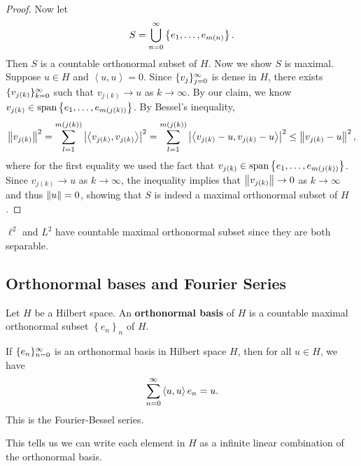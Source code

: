 \documentclass[a4paper]{article}
\renewcommand{\braket}[2]{\left\langle #1, #1 \right\rangle}
\begin{document}
\begin{proof}
Now let 
\[
S = \bigcup_{n=0}^\infty \left\{ e_1, \dots, e_{m(n)} \right\}.
\]
Then $S$ is a countable orthonormal subset of $H$.
Now we show $S$ is maximal. Suppose $u \in H$ and 
$\braket{u}{e_l} = 0$. Since $\{ v_j \}_{j=0}^\infty$ is dense in 
$H$, there exists $\{ v_{j(k)} \}_{k=0}^\infty$ such that 
$v_{j(k)} \to u$ as $k \to \infty$. 
By our claim, we know 
$v_{j(k)} \in \operatorname{span} \left\{ e_1, \dots, e_{m(j(k))} \right\}$.
By Bessel's inequality, 
\[
\begin{aligned}
\norm{v_{j(k)}}^2 
= \sum_{l=1}^{m(j(k))} \abs{\braket{v_{j(k)}}{e_l}}^2 
= \sum_{l=1}^{m(j(k))} \abs{\braket{v_{j(k)} - u}{e_l}}^2 
\leq \norm{v_{j(k)} - u}^2,
\end{aligned}
\]
where for the first equality we used the fact that 
$v_{j(k)} \in \operatorname{span} \left\{ e_1, \dots, e_{m(j(k))} \right\}$.
Since $v_{j(k)} \to u$ as $k \to \infty$, 
the inequality implies that
$\left\lVert v_{j(k)}\right\rVert \to 0$ as $k \to \infty$ 
and thus $\left\lVert u\right\rVert = 0$, showing that 
$S$ is indeed a maximal orthonormal subset 
of $H$.
\end{proof}

\begin{cor}
$\ell^2$ and $L^2$ have countable maximal orthonormal
subset since they are both separable.
\end{cor}

\subsection{Orthonormal bases and Fourier Series}

\begin{defi}
Let $H$ be a Hilbert space. An \textbf{orthonormal basis}
of $H$ is a countable maximal orthonormal subset 
$\left\{ e_n \right\}_n$ of $H$.
\end{defi}

\begin{thm}
If $\{ e_n \}_{n=0}^\infty$ is an orthonormal basis in 
Hilbert space $H$, then for all $u \in H$, we have 
\[
\suminfn \braket{u}{e_n} e_n = u.
\]
This is the Fourier-Bessel series.

This tells us we can write each element in $H$ as a 
infinite linear combination of the orthonormal basis.
\end{thm}
\end{document}
